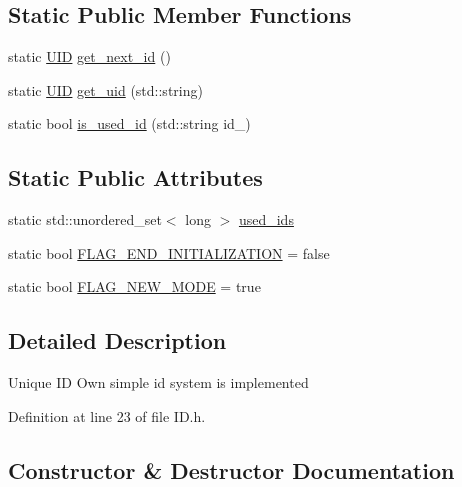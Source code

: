 \subsection*{Static Public Member Functions}
\begin{DoxyCompactItemize}
\item 
static \hyperlink{classsolar__core_1_1_u_i_d}{U\+I\+D} \hyperlink{classsolar__core_1_1_u_i_d_af9f260d6759273ca02438893955c463d}{get\+\_\+next\+\_\+id} ()
\item 
static \hyperlink{classsolar__core_1_1_u_i_d}{U\+I\+D} \hyperlink{classsolar__core_1_1_u_i_d_ab7f9d9bf307f8a7616c004b4341e974c}{get\+\_\+uid} (std\+::string)
\item 
static bool \hyperlink{classsolar__core_1_1_u_i_d_abccf505d210616ef65b71ae96f87d878}{is\+\_\+used\+\_\+id} (std\+::string id\+\_\+)
\end{DoxyCompactItemize}
\subsection*{Static Public Attributes}
\begin{DoxyCompactItemize}
\item 
static std\+::unordered\+\_\+set$<$ long $>$ \hyperlink{classsolar__core_1_1_u_i_d_a8328b1b39052cead4c79ff8bdc55da70}{used\+\_\+ids}
\item 
static bool \hyperlink{classsolar__core_1_1_u_i_d_a23943efd42a1812828f7be421797236f}{F\+L\+A\+G\+\_\+\+E\+N\+D\+\_\+\+I\+N\+I\+T\+I\+A\+L\+I\+Z\+A\+T\+I\+O\+N} = false
\item 
static bool \hyperlink{classsolar__core_1_1_u_i_d_ab96cdedef8e2c2c7fb70505b930415a8}{F\+L\+A\+G\+\_\+\+N\+E\+W\+\_\+\+M\+O\+D\+E} = true
\end{DoxyCompactItemize}


\subsection{Detailed Description}
Unique I\+D Own simple id system is implemented 

Definition at line 23 of file I\+D.\+h.



\subsection{Constructor \& Destructor Documentation}
\hypertarget{classsolar__core_1_1_u_i_d_af5d790831cd429becae2f5143b0f8e92}{}
